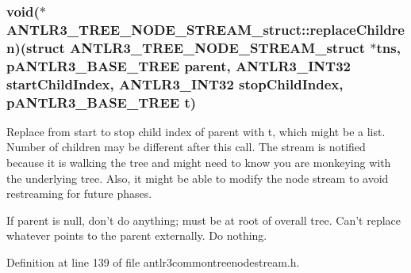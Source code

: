\hypertarget{struct_a_n_t_l_r3___t_r_e_e___n_o_d_e___s_t_r_e_a_m__struct_a445e9d8e9cf809a0d8dd1d7a96d5ddd1}{
\subsubsection[{replace\-Children}]{\setlength{\rightskip}{0pt plus 5cm}void($\ast$ A\-N\-T\-L\-R3\-\_\-\-T\-R\-E\-E\-\_\-\-N\-O\-D\-E\-\_\-\-S\-T\-R\-E\-A\-M\-\_\-struct\-::replace\-Children)(struct {\bf A\-N\-T\-L\-R3\-\_\-\-T\-R\-E\-E\-\_\-\-N\-O\-D\-E\-\_\-\-S\-T\-R\-E\-A\-M\-\_\-struct} $\ast$tns, {\bf p\-A\-N\-T\-L\-R3\-\_\-\-B\-A\-S\-E\-\_\-\-T\-R\-E\-E} parent, {\bf A\-N\-T\-L\-R3\-\_\-\-I\-N\-T32} start\-Child\-Index, {\bf A\-N\-T\-L\-R3\-\_\-\-I\-N\-T32} stop\-Child\-Index, {\bf p\-A\-N\-T\-L\-R3\-\_\-\-B\-A\-S\-E\-\_\-\-T\-R\-E\-E} {\bf t})}}\label{struct_a_n_t_l_r3___t_r_e_e___n_o_d_e___s_t_r_e_a_m__struct_a445e9d8e9cf809a0d8dd1d7a96d5ddd1}
Replace from start to stop child index of parent with t, which might be a list. Number of children may be different after this call. The stream is notified because it is walking the tree and might need to know you are monkeying with the underlying tree. Also, it might be able to modify the node stream to avoid restreaming for future phases.

If parent is null, don't do anything; must be at root of overall tree. Can't replace whatever points to the parent externally. Do nothing. 

Definition at line 139 of file antlr3commontreenodestream.\-h.

